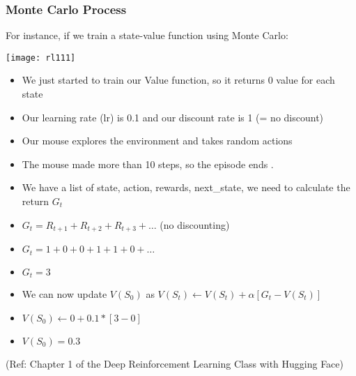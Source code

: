 \begin{frame}[fragile]\frametitle{Monte Carlo Process}

For instance, if we train a state-value function using Monte Carlo:

\begin{center}
\texttt{[image: rl111]}
\end{center}


\begin{itemize}
\item We just started to train our Value function, so it returns 0 value for each state
\item Our learning rate (lr) is 0.1 and our discount rate is 1 (= no discount)
\item Our mouse explores the environment and takes random actions
\item The mouse made more than 10 steps, so the episode ends .
\item We have a list of state, action, rewards, next\_state, we need to calculate the return $G_{t}$
\item $G_t = R_{t+1} + R_{t+2} + R_{t+3} + \ldots $ (no discounting)
\item $G_t = 1 + 0 + 0 + 1 + 1 + 0 + \ldots$
\item $G_t = 3$
\item We can now update $V(S_0)$ as $V(S_t) \leftarrow V(S_t) + \alpha [ G_t - V(S_t)]$
\item $V(S_0) \leftarrow 0 + 0.1 * [3 - 0]$
\item $V(S_0) = 0.3$
\end{itemize}


{\tiny (Ref: Chapter 1 of the Deep Reinforcement Learning Class with Hugging Face)}

\end{frame}



